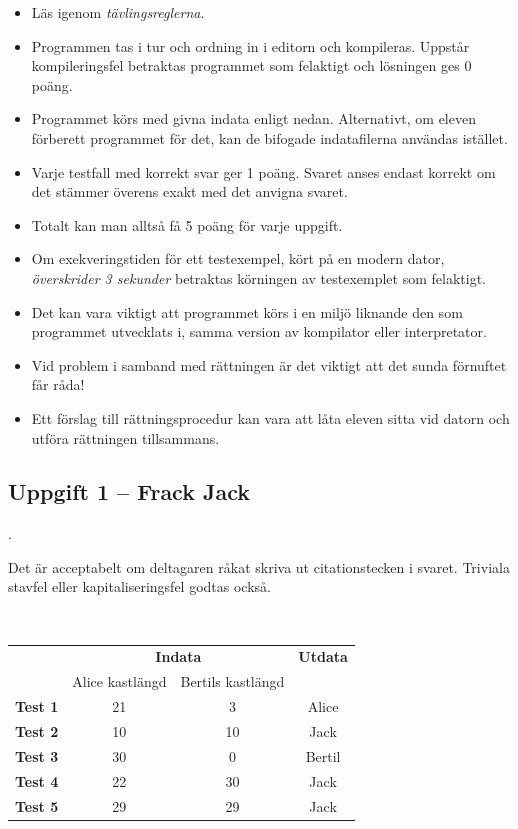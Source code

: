\documentclass[a4paper,12pt,oneside]{amsbook}
\theoremstyle{test}
\newcommand{\fe}[1]{\textbf{#1}}            %
\begin{document}


\thispagestyle{fancy}
\lhead{}
\begin{itemize}
\item Läs igenom \textit{tävlingsreglerna}.
\item Programmen tas i tur och ordning in i editorn och kompileras.
Uppstår kompileringsfel betraktas programmet som felaktigt och lösningen
ges $0$ poäng.
\item Programmet körs med givna indata enligt nedan. Alternativt, om eleven förberett programmet för det, kan de bifogade indatafilerna användas istället.
\item Varje testfall
  med korrekt svar ger 1 poäng. Svaret anses endast korrekt om det stämmer överens exakt med det anvigna svaret.
\item
Totalt kan man
  alltså få 5 poäng för varje uppgift.
\item Om exekveringstiden för ett testexempel, kört på en modern dator,
\textit{överskrider 3 sekunder} betraktas körningen av testexemplet som felaktigt.
\item Det kan vara viktigt att programmet körs i en miljö liknande den som
programmet utvecklats i, samma version av kompilator eller
interpretator.
\item Vid problem i samband med rättningen är det viktigt att det sunda
förnuftet får råda!
\item Ett förslag till rättningsprocedur kan vara att låta eleven sitta vid datorn och utföra rättningen tillsammans.
\end{itemize}

\vspace{1cm}

\subsection*{Uppgift 1 -- Frack Jack}

.

Det är acceptabelt om deltagaren råkat skriva ut citationstecken i svaret.
Triviala stavfel eller kapitaliseringsfel godtas också.
~\\
{\tt 
\begin{tabular}{||l||c|c||c||}\hline\hline
& \multicolumn{2}{c||}{\fe{Indata}} & \multicolumn{1}{c||}{\fe{Utdata}} \\ 
& Alice kastlängd & Bertils kastlängd &  \\ \hline \hline
\fe{Test 1} & 21 & 3  & Alice\\ \hline
\fe{Test 2} & 10 & 10 & Jack\\ \hline
\fe{Test 3} & 30 & 0  & Bertil\\ \hline
\fe{Test 4} & 22 & 30 & Jack\\ \hline
\fe{Test 5} & 29 & 29 & Jack\\ \hline\hline
\end{tabular}
}
\end{document}
